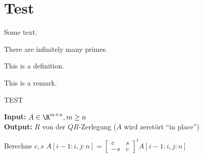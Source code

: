 \chapter{Test}

Some text.

\begin{theorem}
    There are infinitely many primes.
\end{theorem}

\begin{definition}
    This is a definition.
\end{definition}

\begin{remark}
    This is a remark.
\end{remark}
TEST
\begin{algorithm}[H]
    \caption{}
    \textbf{Input:} $A\in\R^{m\times n},m\geq n$\\
    \textbf{Output:} $R$ von der $QR$-Zerlegung ($A$ wird zerstört ``in place'')
    \begin{algorithmic}
            \State Berechne $c,s$
            \State $A[i-1:i,j:n]=\begin{bmatrix}
                c & s \\
                -s & c 
            \end{bmatrix}^t A[i-1:i,j:n]$
        \EndFor
    \EndFor
    \end{algorithmic}
\end{algorithm}